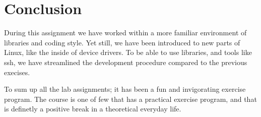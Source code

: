 \section{Conclusion}
During this assignment we have worked within a more familiar environment of  libraries and coding style. Yet still, we have been introduced to new parts of Linux, like the inside of device drivers. To be able to use libraries, and tools like ssh, we have streamlined the development procedure compared to the previous execises. 

To sum up all the lab assignments; it has been a fun and invigorating exercise program. The course is one of few that has a practical exercise program, and that is definetly a positive break in a theoretical everyday life.
